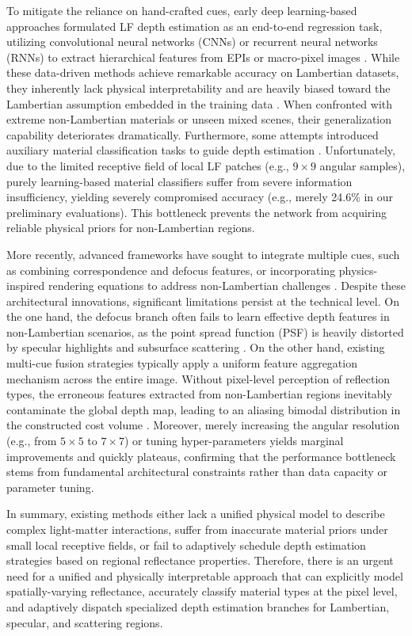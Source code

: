 \documentclass[journal]{IEEEtran}
\begin{document}
To mitigate the reliance on hand-crafted cues, early deep learning-based approaches formulated LF depth estimation as an end-to-end regression task, utilizing convolutional neural networks (CNNs) or recurrent neural networks (RNNs) to extract hierarchical features from EPIs or macro-pixel images . While these data-driven methods achieve remarkable accuracy on Lambertian datasets, they inherently lack physical interpretability and are heavily biased toward the Lambertian assumption embedded in the training data . When confronted with extreme non-Lambertian materials or unseen mixed scenes, their generalization capability deteriorates dramatically. Furthermore, some attempts introduced auxiliary material classification tasks to guide depth estimation . Unfortunately, due to the limited receptive field of local LF patches (e.g., \(9 \times 9\) angular samples), purely learning-based material classifiers suffer from severe information insufficiency, yielding severely compromised accuracy (e.g., merely 24.6\% in our preliminary evaluations). This bottleneck prevents the network from acquiring reliable physical priors for non-Lambertian regions.

More recently, advanced frameworks have sought to integrate multiple cues, such as combining correspondence and defocus features, or incorporating physics-inspired rendering equations to address non-Lambertian challenges . Despite these architectural innovations, significant limitations persist at the technical level. On the one hand, the defocus branch often fails to learn effective depth features in non-Lambertian scenarios, as the point spread function (PSF) is heavily distorted by specular highlights and subsurface scattering . On the other hand, existing multi-cue fusion strategies typically apply a uniform feature aggregation mechanism across the entire image. Without pixel-level perception of reflection types, the erroneous features extracted from non-Lambertian regions inevitably contaminate the global depth map, leading to an aliasing bimodal distribution in the constructed cost volume . Moreover, merely increasing the angular resolution (e.g., from \(5 \times 5\) to \(7 \times 7\)) or tuning hyper-parameters yields marginal improvements and quickly plateaus, confirming that the performance bottleneck stems from fundamental architectural constraints rather than data capacity or parameter tuning.

In summary, existing methods either lack a unified physical model to describe complex light-matter interactions, suffer from inaccurate material priors under small local receptive fields, or fail to adaptively schedule depth estimation strategies based on regional reflectance properties. Therefore, there is an urgent need for a unified and physically interpretable approach that can explicitly model spatially-varying reflectance, accurately classify material types at the pixel level, and adaptively dispatch specialized depth estimation branches for Lambertian, specular, and scattering regions.
\end{document}
